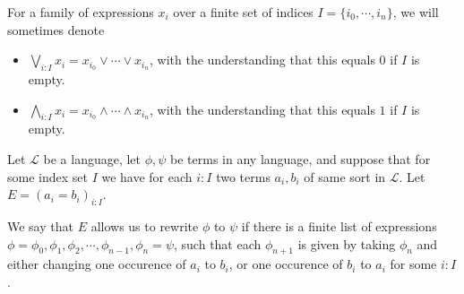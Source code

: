 \documentclass{../util/zariski-small}
\begin{document}
\begin{remark}
  For a family of expressions $x_i$ over a 
  finite set of indices $I = \{i_0, \cdots, i_n\}$, we will sometimes denote 
  \begin{itemize}
    \item $\bigvee_{i:I} x_i = x_{i_0} \vee \cdots \vee x_{i_n}$,
      with the understanding that this equals $0$ if $I$ is empty. 
    \item $\bigwedge_{i:I} x_i = x_{i_0} \wedge \cdots \wedge x_{i_n}$,
      with the understanding that this equals $1$ if $I$ is empty. 
  \end{itemize}
\end{remark}

\begin{definition}
  Let $\mathcal L$ be a language, 
  let $\phi,\psi$ be terms in any language,
  and suppose that for some index set $I$ we have 
  for each $i:I$ two terms $a_i,b_i$ of same sort in $\mathcal L$. 
  Let $E= (a_i = b_i)_{i:I}$. 

  We say that $E$ allows us to rewrite $\phi$ to $\psi$ if there is a finite list of expressions 
  $\phi = \phi_0 , \phi_1, \phi_2, \cdots, \phi_{n-1}, \phi_n = \psi$, 
  such that each $\phi_{n+1}$ is given by taking $\phi_n$ and either changing one occurence of $a_i$ to  $b_i$, 
  or one occurence of $b_i$ to $a_i$ for some $i:I$. 
\end{definition}
\end{document}
